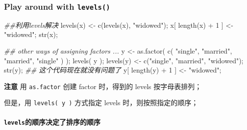 \documentclass[
]{article}
\newenvironment{Shaded}{}{}
\newcommand{\DecValTok}[1]{\textcolor[rgb]{0.25,0.63,0.44}{#1}}
\newcommand{\DocumentationTok}[1]{\textcolor[rgb]{0.73,0.13,0.13}{\textit{#1}}}
\newcommand{\FunctionTok}[1]{\textcolor[rgb]{0.02,0.16,0.49}{#1}}
\newcommand{\NormalTok}[1]{#1}
\newcommand{\OtherTok}[1]{\textcolor[rgb]{0.00,0.44,0.13}{#1}}
\newcommand{\SpecialCharTok}[1]{\textcolor[rgb]{0.25,0.44,0.63}{#1}}
\newcommand{\StringTok}[1]{\textcolor[rgb]{0.25,0.44,0.63}{#1}}
\begin{document}
\hypertarget{play-around-with-levels}{%
\subsubsection{\texorpdfstring{Play around with
\texttt{levels()}}{Play around with levels()}}\label{play-around-with-levels}}

\begin{Shaded}
\begin{Highlighting}[]
\DocumentationTok{\#\#利用levels解决}
\FunctionTok{levels}\NormalTok{(x) }\OtherTok{\textless{}{-}} \FunctionTok{c}\NormalTok{(}\FunctionTok{levels}\NormalTok{(x), }\StringTok{"widowed"}\NormalTok{);}
\NormalTok{x[ }\FunctionTok{length}\NormalTok{(x) }\SpecialCharTok{+} \DecValTok{1}\NormalTok{ ] }\OtherTok{\textless{}{-}} \StringTok{"widowed"}\NormalTok{;}
\FunctionTok{str}\NormalTok{(x);}

\DocumentationTok{\#\# other ways of assigning factors ... }
\NormalTok{y }\OtherTok{\textless{}{-}}  \FunctionTok{as.factor}\NormalTok{( }\FunctionTok{c}\NormalTok{( }\StringTok{"single"}\NormalTok{, }\StringTok{"married"}\NormalTok{, }\StringTok{"married"}\NormalTok{, }\StringTok{"single"}\NormalTok{ ) );}
\FunctionTok{levels}\NormalTok{( y );}
\FunctionTok{levels}\NormalTok{(y) }\OtherTok{\textless{}{-}} \FunctionTok{c}\NormalTok{(}\StringTok{"single"}\NormalTok{, }\StringTok{"married"}\NormalTok{, }\StringTok{"widowed"}\NormalTok{);}
\FunctionTok{str}\NormalTok{(y);}
\DocumentationTok{\#\# 这个代码现在就没有问题了}
\NormalTok{y[ }\FunctionTok{length}\NormalTok{(y) }\SpecialCharTok{+} \DecValTok{1}\NormalTok{ ] }\OtherTok{\textless{}{-}} \StringTok{"widowed"}\NormalTok{;}
\end{Highlighting}
\end{Shaded}

\textbf{注意} 用 \texttt{as.factor} 创建 factor 时，得到的 levels
按字母表排列；

但是，用 \texttt{levels(\ y\ )} 方式指定 levels 时，则按照指定的顺序；

\hypertarget{levelsux7684ux987aux5e8fux51b3ux5b9aux4e86ux6392ux5e8fux7684ux987aux5e8f}{%
\paragraph{\texorpdfstring{\texttt{levels}的顺序决定了排序的顺序}{levels的顺序决定了排序的顺序}}\label{levelsux7684ux987aux5e8fux51b3ux5b9aux4e86ux6392ux5e8fux7684ux987aux5e8f}}
\end{document}
